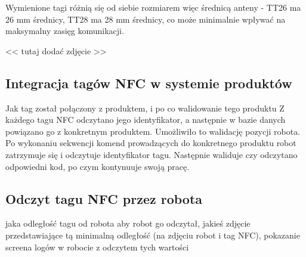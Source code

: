 Wymienione tagi różnią się od siebie rozmiarem więc średnicą anteny - TT26 ma 26 mm średnicy, TT28 ma 28 mm średnicy, co może minimalnie wpływać na maksymalny zasięg komunikacji.

<< tutaj dodać zdjęcie >>


\subsection{Integracja tagów NFC w systemie produktów}

Jak tag został połączony z produktem, i po co walidowanie tego produktu
Z każdego tagu NFC odczytano jego identyfikator, a następnie w bazie danych powiązano go z konkretnym produktem. Umożliwiło to walidację pozycji robota. Po wykonaniu sekwencji komend prowadzących do konkretnego produktu robot zatrzymuje się i odczytuje identyfikator tagu. Następnie waliduje czy odczytano odpowiedni kod, po czym kontynuuje swoją pracę. 


\subsection{Odczyt tagu NFC przez robota}

jaka odległość tagu od robota aby robot go odczytał, jakieś zdjęcie przedstawiające tą minimalną odległość (na zdjęciu robot i tag NFC), pokazanie screena logów w robocie z odczytem tych wartości
